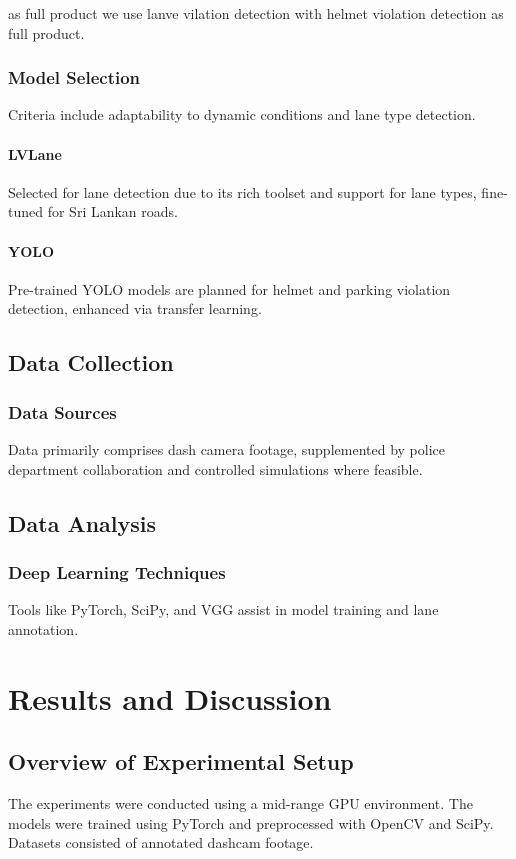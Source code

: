 \documentclass[12pt,a4paper]{article}
\begin{document}
as full product we use lanve vilation detection with helmet violation detection as full product.


\subsubsection{Model Selection}
Criteria include adaptability to dynamic conditions and lane type detection.

\paragraph{LVLane}
Selected for lane detection due to its rich toolset and support for lane types, fine-tuned for Sri Lankan roads.

\paragraph{YOLO}
Pre-trained YOLO models are planned for helmet and parking violation detection, enhanced via transfer learning.

\subsection{Data Collection}
\subsubsection{Data Sources}
Data primarily comprises dash camera footage, supplemented by police department collaboration and controlled simulations where feasible.

\subsection{Data Analysis}
\subsubsection{Deep Learning Techniques}
Tools like PyTorch, SciPy, and VGG assist in model training and lane annotation.

\section{Results and Discussion}

\subsection{Overview of Experimental Setup}
The experiments were conducted using a mid-range GPU environment. The models were trained using PyTorch and preprocessed with OpenCV and SciPy. Datasets consisted of annotated dashcam footage.
\end{document}
